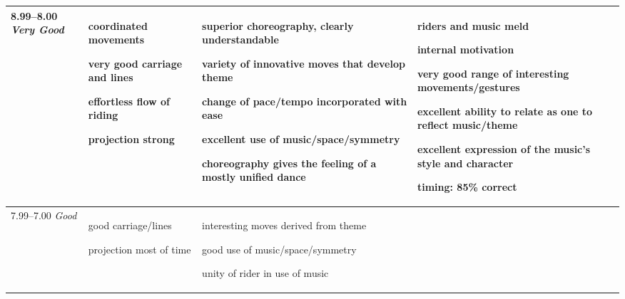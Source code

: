 \begin{longtable}{|p{1.5cm}|p{5.5cm}|p{5.5cm}|p{5.5cm}|}
8.99--8.00 \newline
\emph{Very Good} &

\begin{judging_items}%
\item coordinated movements 
\item very good carriage and lines
\item effortless flow of riding
\item projection strong
\end{judging_items} &

\begin{judging_items}%
\item superior choreography, clearly understandable
\item variety of innovative moves that develop theme
\item change of pace/tempo incorporated with ease
\item excellent use of music/space/symmetry
\item choreography gives the feeling of a mostly unified dance
\end{judging_items} &

\begin{judging_items}%
\item riders and music meld
\item internal motivation
\item very good range of interesting movements/gestures
\item excellent ability to relate as one to reflect music/theme
\item excellent expression of the music's style and character
\item timing: 85\% correct
\end{judging_items} \\
\hline

7.99--7.00 \newline
\emph{Good} &

\begin{judging_items}%
\item good carriage/lines
\item projection most of time
\end{judging_items} &

\begin{judging_items}%
\item interesting moves derived from theme
\item good use of music/space/symmetry
\item unity of rider in use of music
\end{judging_items} &


\end{longtable}
